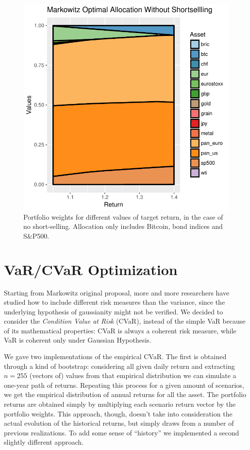 \documentclass[12pt]{elsarticle}
\begin{document}
\begin{figure}[h!]
\includegraphics[width=\textwidth]{allocation_markowitz_btc_percentage.pdf}
\caption{Portfolio weights for different values of target return, in the case of no short-selling. Allocation only includes Bitcoin, bond indices and S\&P500.}
\end{figure}





\section{VaR/CVaR Optimization}
Starting from Markowitz original proposal, more and more researchers have studied how to include different risk measures than the variance, since the underlying hypothesis of gaussianity might not be verified.
We decided to consider the \textit{Condition Value at Risk} (CVaR), instead of the simple VaR because of its mathematical properties: CVaR is always a coherent risk measure, while VaR is coherent only under Gaussian Hypothesis.

We gave two implementations of the empirical CVaR. The first is obtained through a kind of bootstrap: considering all given daily return and extracting $n=255$ (vectors of) values from that empirical distribution we can simulate a one-year path of returns. Repeating this process for a given amount of scenarios, we get the empirical distribution of annual returns for all the asset. The portfolio returns are obtained simply by multiplying each scenario return vector by the portfolio weights. 
This approach, though, doesn't take into consideration the actual evolution of the historical returns, but simply draws from a number of previous realizations.
To add some sense of ``history'' we implemented a second slightly different approach.
\end{document}
